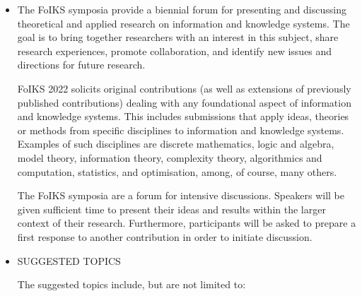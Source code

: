\documentclass[prodmode,acmtecs]{acmsmall} %
\begin{document}
\begin{itemize}\item  The FoIKS symposia provide a biennial forum for presenting and discussing theoretical and applied research on information and knowledge systems. The goal is to bring together researchers with an interest in this subject, share research experiences, promote collaboration, and identify new issues and directions for future research.  
 
  FoIKS 2022 solicits original contributions (as well as extensions of previously published contributions) dealing with any foundational aspect of information and knowledge systems. This includes submissions that apply ideas, theories or methods from specific disciplines to information and knowledge systems. Examples of such disciplines are discrete mathematics, logic and algebra, model theory, information theory, complexity theory, algorithmics and computation, statistics, and optimisation, among, of course, many others. 
 
  The FoIKS symposia are a forum for intensive discussions. Speakers will be given sufficient time to present their ideas and results within the larger context of their research. Furthermore, participants will be asked to prepare a first response to another contribution in order to initiate discussion. 
 
\item  SUGGESTED TOPICS 
 
  The suggested topics include, but are not limited to: 
 

\end{itemize}
\end{document}
